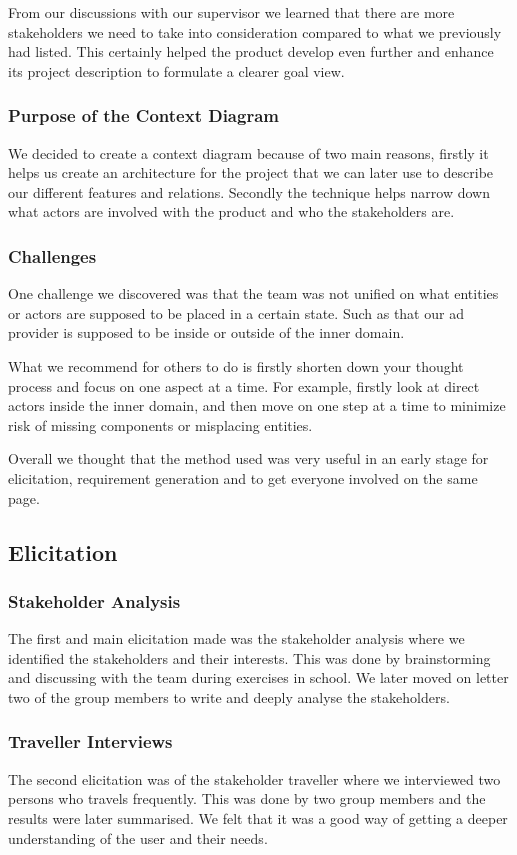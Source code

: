 From our discussions with our supervisor we learned that there are more stakeholders we need to take into consideration compared to what we previously had listed. This certainly helped the product develop even further and enhance its project description to formulate a clearer goal view. 

\subsubsection{Purpose of the Context Diagram}
We decided to create a context diagram because of two main reasons, firstly it helps us create an architecture for the project that we can later use to describe our different features and relations. Secondly the technique helps narrow down what actors are involved with the product and who the stakeholders are.

\subsubsection{Challenges}
One challenge we discovered was that the team was not unified on what entities or actors are supposed to be placed in a certain state. Such as that our ad provider is supposed to be inside or outside of the inner domain.

What we recommend for others to do is firstly shorten down your thought process and focus on one aspect at a time. For example, firstly look at direct actors inside the inner domain, and then move on one step at a time to minimize risk of missing components or misplacing entities.

Overall we thought that the method used was very useful in an early stage for elicitation, requirement generation and to get everyone involved on the same page.

\subsection{Elicitation}
\subsubsection{Stakeholder Analysis}
The first and main elicitation made was the stakeholder analysis where we identified the stakeholders and their interests. This was done by brainstorming and discussing with the team during exercises in school. We later moved on letter two of the group members to write and deeply analyse the stakeholders.

\subsubsection{Traveller Interviews}
The second elicitation was of the stakeholder traveller where we interviewed two persons who travels frequently. This was done by two group members and the results were later summarised. We felt that it was a good way of getting a deeper understanding of the user and their needs. 

